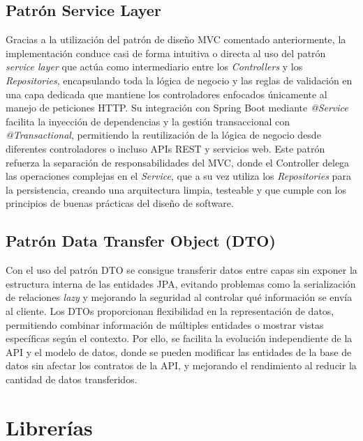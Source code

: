 \subsection{Patrón Service Layer}\label{patron-service-layer}
Gracias a la utilización del patrón de diseño MVC comentado anteriormente, la implementación conduce casi de forma intuitiva o directa al uso del patrón \emph{service layer} que actúa como intermediario entre los \emph{Controllers} y los \emph{Repositories}, encapsulando toda la lógica de negocio y las reglas de validación en una capa dedicada que mantiene los controladores enfocados únicamente al manejo de peticiones HTTP. Su integración con Spring Boot mediante \emph{@Service} facilita la inyección de dependencias y la gestión transaccional con \emph{@Transactional}, permitiendo la reutilización de la lógica de negocio desde diferentes controladores o incluso APIs REST y servicios web. Este patrón refuerza la separación de responsabilidades del MVC, donde el Controller delega las operaciones complejas en el \emph{Service}, que a su vez utiliza los \emph{Repositories} para la persistencia, creando una arquitectura limpia, testeable y que cumple con los principios de buenas prácticas del diseño de software.

\subsection{Patrón Data Transfer Object (DTO)}\label{patron-data-transfer-object}
Con el uso del patrón DTO se consigue transferir datos entre capas sin exponer la estructura interna de las entidades JPA, evitando problemas como la serialización de relaciones \emph{lazy} y mejorando la seguridad al controlar qué información se envía al cliente. Los DTOs proporcionan flexibilidad en la representación de datos, permitiendo combinar información de múltiples entidades o mostrar vistas específicas según el contexto. Por ello, se facilita la evolución independiente de la API y el modelo de datos, donde se pueden modificar las entidades de la base de datos sin afectar los contratos de la API, y mejorando el rendimiento al reducir la cantidad de datos transferidos.

\section{Librerías}\label{librerias}

